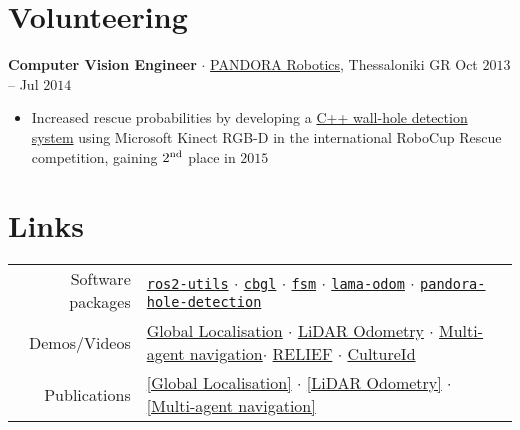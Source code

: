 \documentclass[a4paper,10pt,twoside]{article}
\begin{document}
\section{\textbf{Volunteering}}\verticalspacebetweensectionandcontent

\noindent \textbf{Computer Vision Engineer} $\cdot$ \href{https://issel.ee.auth.gr/pandora-robotics/}{PANDORA Robotics}, Thessaloniki GR \hfill {\small \textcolor{agray}{Oct $2013$ -- Jul $2014$}}
  \begin{minipage}[t]{\textwidth}
    \begin{itemize}
      \item Increased rescue probabilities by developing a \href{https://github.com/li9i/pandora\_vision\_2014}{C++ wall-hole detection system} using Microsoft Kinect RGB-D in the international RoboCup Rescue competition, gaining $2^{\textnormal{nd}}$ place in $2015$
    \end{itemize}
  \end{minipage}
\verticalspacebetweensections

\section{\textbf{Links}}\verticalspacebetweensectionandcontent

\begin{center}
\begin{tabular}{rl}
  Software packages &
  \href{https://github.com/li9i/ros2-utils}{\texttt{ros2-utils}} $\cdot$
  \href{https://github.com/cbgl/cbgl}{\texttt{cbgl}} $\cdot$
  \href{https://github.com/fourier-scan-matcher/fsm}{\texttt{fsm}} $\cdot$
  \href{https://github.com/li9i/lama-odom}{\texttt{lama-odom}} $\cdot$
  \href{https://github.com/li9i/pandora\_vision\_2014/tree/hydro-devel/pandora\_vision\_hole\_detector}{\texttt{pandora-hole-detection}} \\

  Demos/Videos &
  \href{https://www.youtube.com/watch?v=xaDKjI0WkDc}{\hphantom{[}Global Localisation\hphantom{]}} $\cdot$
  \href{https://www.youtube.com/watch?v=hB4qsHCEXGI}{\hphantom{[}LiDAR Odometry\hphantom{]}} $\cdot$
  \href{https://www.youtube.com/watch?v=937OZez1iN8}{\hphantom{[}Multi-agent navigation\hphantom{]}}$\cdot$
  \href{https://relief.web.auth.gr/#pg-72-1}{RELIEF} $\cdot$
  \href{https://cultureid.web.auth.gr/?page_id=200&lang=en#pl-200}{CultureId}
  \\
  Publications &
  \href{https://ieeexplore.ieee.org/abstract/document/10802235}{[Global Localisation]} $\cdot$
  \href{https://ieeexplore.ieee.org/abstract/document/9981228}{[LiDAR Odometry]} $\cdot$
  \href{https://www.tandfonline.com/doi/full/10.1080/00207179.2018.1514129}{[Multi-agent navigation]}
\end{tabular}
\end{center}
\verticalspacebetweensections
\end{document}
